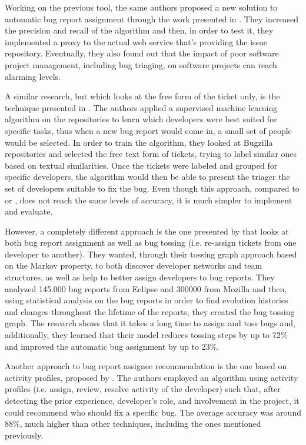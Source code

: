 \documentclass{mprop}
\begin{document}
Working on the previous tool, the same authors proposed a new solution to automatic
bug report assignment through the work presented in \citet{anvik2011reducing}.
They increased the precision and recall of the algorithm and then, in order to 
test it, they implemented a proxy to the actual web service that's providing the
issue repository. Eventually, they also found out that the impact of poor
software project management, including bug triaging, on software projects can
reach alarming levels.

A similar research, but which looks at the free form of the ticket only, is
the technique presented in \citet{anvik2006should}. The authors applied a 
supervised machine learning algorithm on the repositories to learn which 
developers were best suited for specific tasks, thus when a new bug report would 
come in, a small set of people would be selected. In order to train the algorithm,
they looked at Bugzilla repositories and selected the free text form of tickets, 
trying to label similar ones based on textual similarities. Once the tickets were
labeled and grouped for specific developers, the algorithm would then be able
to present the triager the set of developers suitable to fix the bug. Even though
this approach, compared to \citet{anvik2006automating} or 
\citet{anvik2011reducing}, does not reach the same levels of accuracy, it is much
simpler to implement and evaluate.

However, a completely different approach is the one presented by 
\citet{jeong2009improving} that looks at both bug report assignment as well as bug 
tossing (i.e. re-assign tickets from one developer to another). They wanted, 
through their tossing graph approach based on the Markov property, to both 
discover developer networks and team structures, as well as help to better assign 
developers to bug reports. They analyzed 145.000 bug reports from Eclipse and 
300000 from Mozilla and then, using statistical analysis on the bug reports in 
order to find evolution histories and changes throughout the lifetime of the 
reports, they created the bug tossing graph. The research shows that it takes a 
long time to assign and toss bugs and, additionally, they learned that their model 
reduces tossing steps by up to 72\% and improved the automatic bug assignment by 
up to 23\%.

Another approach to bug report assignee recommendation is the one based on
activity profiles, proposed by \citet{Naguib2013BugReportAssignee}. The authors 
employed an algorithm using activity profiles (i.e. assign, review, resolve 
activity of the developer) such that, after detecting the prior
experience, developer's role, and involvement in the project, it could
recommend who should fix a specific bug. The average accuracy was around
88\%, much higher than other techniques, including the ones mentioned previously. 
\end{document}
